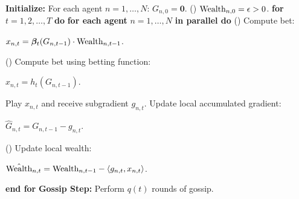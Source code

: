 \begin{algorithmic}[1]
    \STATE{} \textbf{Initialize:} For each agent $n=1, \dots, N$:
    \STATE{} \hspace{\algorithmicindent} $G_{n,0} = \mathbf{0}$.
    \STATE{} \hspace{\algorithmicindent} \colorbox{red!30}{() $\text{Wealth}_{n,0} = \epsilon > 0$.}
    \STATE{} \textbf{for} $t=1, 2, \dots, T$ \textbf{do}
    \STATE{} \hspace{\algorithmicindent} \textbf{for each agent} $n=1, \dots, N$ \textbf{in parallel do}
    \STATE{} \hspace{\algorithmicindent}\hspace{\algorithmicindent} \colorbox{red!30}{() Compute bet:}
    \begin{center}
        \colorbox{red!30}{$x_{n,t} = \boldsymbol{\beta}_t(G_{n, t-1}) \cdot \text{Wealth}_{n, t-1}$.}
    \end{center}
    \STATE{} \hspace{\algorithmicindent}\hspace{\algorithmicindent} \colorbox{green!30}{() Compute bet using betting function:}
    \begin{center}
        \colorbox{green!30}{$x_{n,t} = h_t(G_{n, t-1})$.}
    \end{center}
    \STATE{} \hspace{\algorithmicindent}\hspace{\algorithmicindent} Play $x_{n,t}$ and receive subgradient $g_{n,t}$.
    \STATE{} \hspace{\algorithmicindent}\hspace{\algorithmicindent} Update local accumulated gradient: \\
    \begin{center}
        $\hat{G}_{n,t} = G_{n,t-1} - g_{n,t}$.
    \end{center}
    \STATE{} \hspace{\algorithmicindent}\hspace{\algorithmicindent} \colorbox{red!30}{() Update local wealth:} \\
    \begin{center}
        \colorbox{red!30}{$\hat{\text{Wealth}}_{n,t} = \text{Wealth}_{n,t-1} - \langle g_{n,t}, x_{n,t} \rangle$.}
    \end{center}
    \STATE{} \hspace{\algorithmicindent} \textbf{end for}
    \STATE{} \hspace{\algorithmicindent} \textbf{Gossip Step:} Perform $q(t)$ rounds of gossip.

\end{algorithmic}
